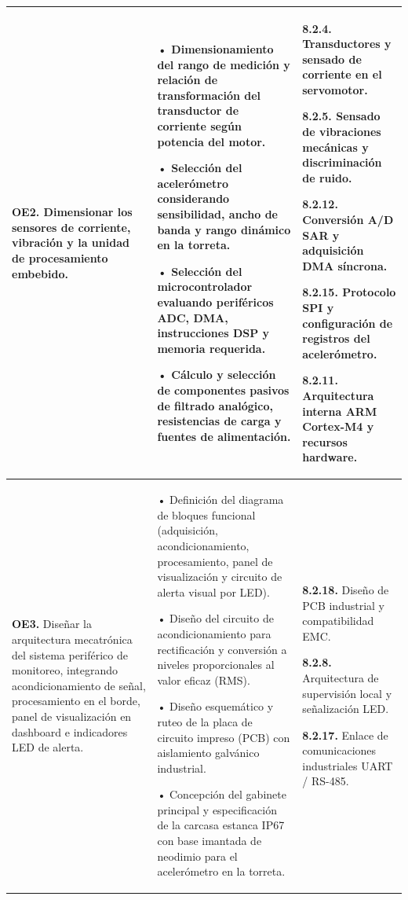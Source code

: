 {\begin{longtable}{|>{\raggedright\arraybackslash}p{3.3cm}|>{\raggedright\arraybackslash}p{5.2cm}|>{\raggedright\arraybackslash}p{5.2cm}|}
\textbf{OE2.} Dimensionar los sensores de corriente, vibración y la unidad de procesamiento embebido. &
• Dimensionamiento del rango de medición y relación de transformación del transductor de corriente según potencia del motor.\par\vspace{1mm}
• Selección del acelerómetro considerando sensibilidad, ancho de banda y rango dinámico en la torreta.\par\vspace{1mm}
• Selección del microcontrolador evaluando periféricos ADC, DMA, instrucciones DSP y memoria requerida.\par\vspace{1mm}
• Cálculo y selección de componentes pasivos de filtrado analógico, resistencias de carga y fuentes de alimentación. &
\textbf{8.2.4.} Transductores y sensado de corriente en el servomotor.\par\vspace{1mm}
\textbf{8.2.5.} Sensado de vibraciones mecánicas y discriminación de ruido.\par\vspace{1mm}
\textbf{8.2.12.} Conversión A/D SAR y adquisición DMA síncrona.\par\vspace{1mm}
\textbf{8.2.15.} Protocolo SPI y configuración de registros del acelerómetro.\par\vspace{1mm}
\textbf{8.2.11.} Arquitectura interna ARM Cortex-M4 y recursos hardware. \\ \hline

\textbf{OE3.} Diseñar la arquitectura mecatrónica del sistema periférico de monitoreo, integrando acondicionamiento de señal, procesamiento en el borde, panel de visualización en dashboard e indicadores LED de alerta. &
• Definición del diagrama de bloques funcional (adquisición, acondicionamiento, procesamiento, panel de visualización y circuito de alerta visual por LED).\par\vspace{1mm}
• Diseño del circuito de acondicionamiento para rectificación y conversión a niveles proporcionales al valor eficaz (RMS).\par\vspace{1mm}
• Diseño esquemático y ruteo de la placa de circuito impreso (PCB) con aislamiento galvánico industrial.\par\vspace{1mm}
• Concepción del gabinete principal y especificación de la carcasa estanca IP67 con base imantada de neodimio para el acelerómetro en la torreta. &
\textbf{8.2.18.} Diseño de PCB industrial y compatibilidad EMC.\par\vspace{1mm}
\textbf{8.2.8.} Arquitectura de supervisión local y señalización LED.\par\vspace{1mm}
\textbf{8.2.17.} Enlace de comunicaciones industriales UART / RS-485. \\ \hline


\end{longtable}}
